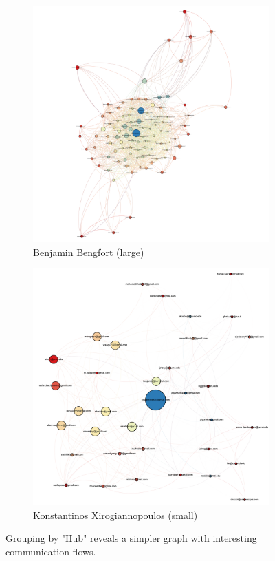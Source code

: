 \documentclass[11pt,letterpaper]{article}
\begin{document}
\begin{figure}[h]
	\centering
	\begin{subfigure}{0.49\textwidth}
		\centering
		\includegraphics[width=\textwidth]{figures/benjamin_simplification.png}
		\caption{\textsf{Benjamin Bengfort (large)}}
        \label{fig:benjamin_simplification}
	\end{subfigure} \hfill
	\begin{subfigure}{0.49\textwidth}
		\centering
		\includegraphics[width=\textwidth]{figures/kostas_simplification.png}
		\caption{\textsf{Konstantinos Xirogiannopoulos (small)}}
        \label{fig:kostas_simplification}
	\end{subfigure}
    \caption{\textsf{Grouping by "Hub" reveals a simpler graph with interesting communication flows.}}
    \label{fig:simplification}
\end{figure}
\end{document}
